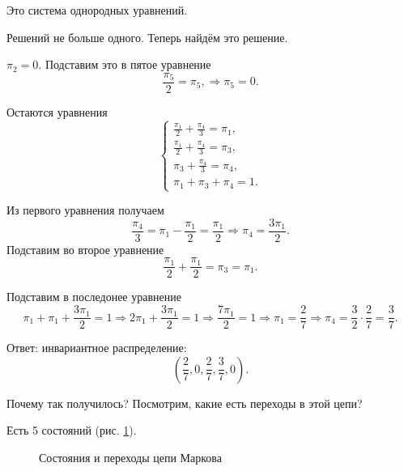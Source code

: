 Это система однородных уравнений.

Решений не больше одного.
Теперь найдём это решение.

$ \pi_2 = 0$.
Подставим это в пятое уравнение
\begin{equation*}
  \frac{ \pi_5}{2} = \pi_5, \Rightarrow
  \pi_5 = 0.
\end{equation*}

Остаются уравнения
\begin{equation*}
  \begin{cases}
    \frac{ \pi_1}{2} + \frac{ \pi_4}{3} = \pi_1, \\
    \frac{ \pi_1}{2} + \frac{ \pi_4}{3} = \pi_3, \\
    \pi_3 + \frac{\pi_4}{3} = \pi_4, \\
    \pi_1 + \pi_3 + \pi_4 = 1.
  \end{cases}
\end{equation*}

Из первого уравнения получаем
\begin{equation*}
  \frac{ \pi_4}{3} = \pi_1 - \frac{ \pi_1}{2} = \frac{ \pi_1}{2} \Rightarrow
  \pi_4 = \frac{3 \pi_1}{2}.
\end{equation*}
Подставим во второе уравнение
\begin{equation*}
  \frac{ \pi_1}{2} + \frac{ \pi_1}{2} =
  \pi_3 = \pi_1.
\end{equation*}

Подставим в последонее уравнение
\begin{equation*}
  \pi_1 + \pi_1 + \frac{3 \pi_1}{2} = 1 \Rightarrow
  2 \pi_1 + \frac{3 \pi_1}{2} = 1 \Rightarrow
  \frac{7 \pi_1}{2} = 1 \Rightarrow
  \pi_1 = \frac{2}{7} \Rightarrow
  \pi_4 = \frac{3}{2} \cdot \frac{2}{7} = \frac{3}{7}.
\end{equation*}

Ответ: инвариантное распределение:
\begin{equation*}
  \left( \frac{2}{7}, 0, \frac{2}{7}, \frac{3}{7}, 0 \right).
\end{equation*}

Почему так получилось?
Посмотрим, какие есть переходы в этой цепи?

Есть 5 состояний (рис. \ref{fig:1512}).

\begin{figure}[h]
  \centering
  
  \caption{Состояния и переходы цепи Маркова}
  \label{fig:1512}
\end{figure}

